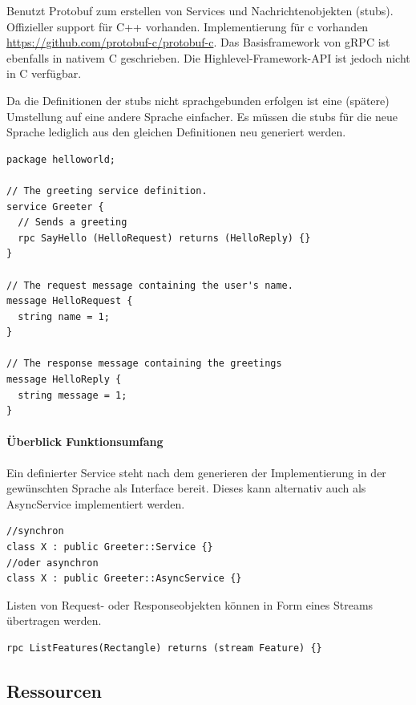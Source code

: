 \documentclass[a4paper,10pt]{article}
\numberwithin{figure}{section}
\numberwithin{table}{section}
\begin{document}

Benutzt Protobuf zum erstellen von Services und Nachrichtenobjekten (stubs).
Offizieller support für C++ vorhanden.
Implementierung für c vorhanden \url{https://github.com/protobuf-c/protobuf-c}.
Das Basisframework von gRPC ist ebenfalls in nativem C geschrieben.
Die Highlevel-Framework-API ist jedoch nicht in C verfügbar.

Da die Definitionen der stubs nicht sprachgebunden erfolgen ist eine (spätere) Umstellung auf eine andere Sprache einfacher.
Es müssen die stubs für die neue Sprache lediglich aus den gleichen Definitionen neu generiert werden.

\begin{lstlisting}[frame=single,caption=Beispiel grpc, breaklines=true]
package helloworld;

// The greeting service definition.
service Greeter {
  // Sends a greeting
  rpc SayHello (HelloRequest) returns (HelloReply) {}
}

// The request message containing the user's name.
message HelloRequest {
  string name = 1;
}

// The response message containing the greetings
message HelloReply {
  string message = 1;
}
\end{lstlisting}

\paragraph{Überblick Funktionsumfang}

Ein definierter Service steht nach dem generieren der Implementierung in der gewünschten Sprache als Interface bereit.
Dieses kann alternativ auch als AsyncService implementiert werden.

\begin{lstlisting}[frame=single,caption=grpc Service Definition, breaklines=true]
//synchron
class X : public Greeter::Service {}
//oder asynchron
class X : public Greeter::AsyncService {}
\end{lstlisting}

Listen von Request- oder Responseobjekten können in Form eines Streams übertragen werden.

\begin{lstlisting}[frame=single,caption=grpc Funktion Definition, breaklines=true]
rpc ListFeatures(Rectangle) returns (stream Feature) {}
\end{lstlisting}

\subsection{Ressourcen}
\end{document}
